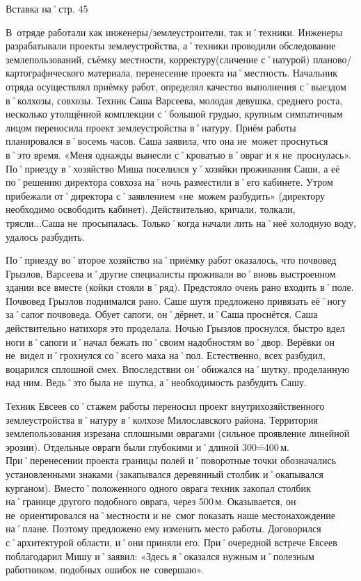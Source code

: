 Вставка на˚стр. 45

В~отряде работали как инженеры\-/землеустроители, так и˚техники. Инженеры разрабатывали проекты землеустройства, а˚техники проводили обследование землепользований, съёмку местности, корректуру(сличение с˚натурой) планово\-/картографического материала, перенесение проекта на˚местность. Начальник отряда осуществлял приёмку работ, определял качество выполнения с˚выездом в˚колхозы, совхозы. Техник Саша Варсеева, молодая девушка, среднего роста, несколько утолщённой комплекции с˚большой грудью, крупным симпатичным лицом переносила проект землеустройства в˚натуру. Приём работы планировался в˚восемь часов. Саша заявила, что она не~может проснуться в˚это время. «Меня однажды вынесли с˚кроватью в˚овраг и я не~проснулась». По˚приезду в˚хозяйство Миша поселился у˚хозяйки проживания Саши, а её по˚решению директора совхоза на˚ночь разместили в˚его кабинете. Утром прибежали от˚директора с˚заявлением «не~можем разбудить» (директору необходимо освободить кабинет). Действительно, кричали, толкали, трясли...Саша не~просыпалась. Только˚когда начали лить на˚неё холодную воду, удалось разбудить.

По˚приезду во˚второе хозяйство на˚приёмку работ оказалось, что почвовед Грызлов, Варсеева и˚другие специалисты проживали во˚вновь выстроенном здании все вместе (койки стояли в˚ряд). Предстояло очень рано входить в˚поле. Почвовед Грызлов поднимался рано. Саше шутя предложено привязать её˚ногу за˚сапог почвоведа. Обует сапоги, он˚дёрнет, и˚Саша проснётся. Саша действительно натихоря это проделала. Ночью Грызлов проснулся, быстро вдел ноги в˚сапоги и˚начал бежать по˚своим надобностям во˚двор. Верёвки он не~видел и˚грохнулся со˚всего маха на˚пол. Естественно, всех разбудил, воцарился сплошной смех. Впоследствии он˚обижался на˚шутку, проделанную над ним. Ведь˚это была не~шутка, а˚необходимость разбудить Сашу.

Техник Евсеев со˚стажем работы переносил проект внутрихозяйственного землеустройства в˚натуру в˚колхозе Милославского района. Территория землепользования изрезана сплошными оврагами (сильное проявление линейной эрозии). Отдельные овраги были глубокими и˚длиной 300\==400\,м. При˚перенесении проекта границы полей и˚поворотные точки обозначались установленными знаками (закапывался деревянный столбик и˚окапывался курганом). Вместо˚положенного одного оврага техник закопал столбик на˚границе другого подобного оврага, через 500\,м. Оказывается, он не~ориентировался на˚местности и не~смог показать наше местонахождение на˚плане. Поэтому предложено ему изменить место работы. Договорился с˚архитектурой области, и˚они приняли его. При˚очередной встрече Евсеев поблагодарил Мишу и˚заявил: «Здесь я˚оказался нужным и˚полезным работником, подобных ошибок не~совершаю».

